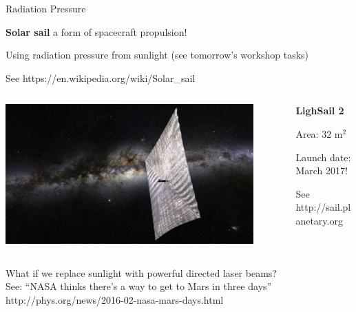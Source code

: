 \begin{frame}{Radiation Pressure}

{\bf Solar sail} a form of spacecraft propulsion!
\begin{itemize}
{\small
  \item Using radiation pressure from sunlight (see tomorrow's
    workshop tasks)
  \item See {\color{blue}https://en.wikipedia.org/wiki/Solar\_sail}
}
\end{itemize}

\vspace{0.2cm}

\begin{columns}
  \begin{column}{0.50\textwidth}
   \begin{center}
         \includegraphics[width=0.90\textwidth]{./images/photos/lightsail.jpg}\\
   \end{center}
  \end{column}
  \begin{column}{0.50\textwidth}
       {\bf LighSail 2}
      \begin{itemize}
      {\small
        \item Area: 32 m$^2$
        \item Launch date: March 2017!
        \item See {\color{blue}http://sail.planetary.org}
      }
      \end{itemize}
  \end{column}
\end{columns}

\vspace{0.4cm}

What if we replace sunlight with powerful directed laser beams?\\
See: ``NASA thinks there's a way to get to Mars in three days''\\
{\color{blue}http://phys.org/news/2016-02-nasa-mars-days.html}\\

\end{frame}


